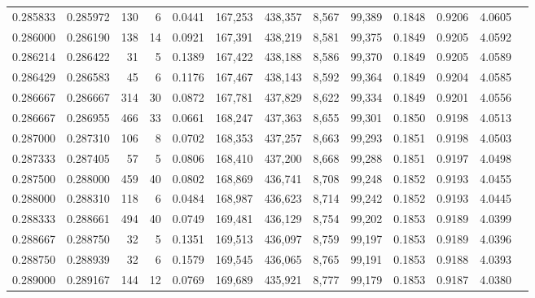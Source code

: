 \begin{tabular}{rrrrrrrrrrrrr}
0.285833 & 0.285972 &   130 &   6 &                                     0.0441 & 167,253 & 438,357 &   8,567 &  99,389 & 0.1848 & 0.9206 & 4.0605 \\
0.286000 & 0.286190 &   138 &  14 &                                     0.0921 & 167,391 & 438,219 &   8,581 &  99,375 & 0.1849 & 0.9205 & 4.0592 \\
0.286214 & 0.286422 &    31 &   5 &                                     0.1389 & 167,422 & 438,188 &   8,586 &  99,370 & 0.1849 & 0.9205 & 4.0589 \\
0.286429 & 0.286583 &    45 &   6 &                                     0.1176 & 167,467 & 438,143 &   8,592 &  99,364 & 0.1849 & 0.9204 & 4.0585 \\
0.286667 & 0.286667 &   314 &  30 &                                     0.0872 & 167,781 & 437,829 &   8,622 &  99,334 & 0.1849 & 0.9201 & 4.0556 \\
0.286667 & 0.286955 &   466 &  33 &                                     0.0661 & 168,247 & 437,363 &   8,655 &  99,301 & 0.1850 & 0.9198 & 4.0513 \\
0.287000 & 0.287310 &   106 &   8 &                                     0.0702 & 168,353 & 437,257 &   8,663 &  99,293 & 0.1851 & 0.9198 & 4.0503 \\
0.287333 & 0.287405 &    57 &   5 &                                     0.0806 & 168,410 & 437,200 &   8,668 &  99,288 & 0.1851 & 0.9197 & 4.0498 \\
0.287500 & 0.288000 &   459 &  40 &                                     0.0802 & 168,869 & 436,741 &   8,708 &  99,248 & 0.1852 & 0.9193 & 4.0455 \\
0.288000 & 0.288310 &   118 &   6 &                                     0.0484 & 168,987 & 436,623 &   8,714 &  99,242 & 0.1852 & 0.9193 & 4.0445 \\
0.288333 & 0.288661 &   494 &  40 &                                     0.0749 & 169,481 & 436,129 &   8,754 &  99,202 & 0.1853 & 0.9189 & 4.0399 \\
0.288667 & 0.288750 &    32 &   5 &                                     0.1351 & 169,513 & 436,097 &   8,759 &  99,197 & 0.1853 & 0.9189 & 4.0396 \\
0.288750 & 0.288939 &    32 &   6 &                                     0.1579 & 169,545 & 436,065 &   8,765 &  99,191 & 0.1853 & 0.9188 & 4.0393 \\
0.289000 & 0.289167 &   144 &  12 &                                     0.0769 & 169,689 & 435,921 &   8,777 &  99,179 & 0.1853 & 0.9187 & 4.0380 \\

\end{tabular}
